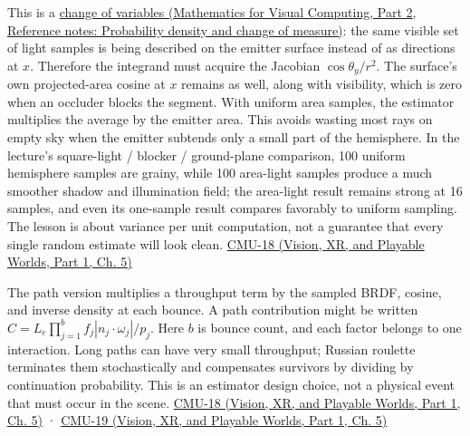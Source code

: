 This is a \href{../02-Mathematics-for-Visual-Computing-P02/main.pdf\#nameddest=appendix-4815cd87ab8b}{change of variables (Mathematics for Visual Computing, Part 2, Reference notes: Probability density and change of measure)}: the same visible set of light samples is being described on the emitter surface instead of as directions at \(x\). Therefore the integrand must acquire the Jacobian \(\cos\theta_y/r^2\). The surface's own projected-area cosine at \(x\) remains as well, along with visibility, which is zero when an occluder blocks the segment. With uniform area samples, the estimator multiplies the average by the emitter area. This avoids wasting most rays on empty sky when the emitter subtends only a small part of the hemisphere. In the lecture's square-light / blocker / ground-plane comparison, 100 uniform hemisphere samples are grainy, while 100 area-light samples produce a much smoother shadow and illumination field; the area-light result remains strong at 16 samples, and even its one-sample result compares favorably to uniform sampling. The lesson is about variance per unit computation, not a guarantee that every single random estimate will look clean. \href{../07-Vision-XR-and-Playable-Worlds-P01/main.pdf\#nameddest=04-visual-computing-ii-ch036-cmu-18---monte-carlo-rendering}{CMU-18 (Vision, XR, and Playable Worlds, Part 1, Ch. 5)}

The path version multiplies a throughput term by the sampled BRDF, cosine, and inverse density at each bounce. A path contribution might be written \(C= L_e\prod_{j=1}^b f_j|n_j\cdot\omega_j|/p_j\). Here \(b\) is bounce count, and each factor belongs to one interaction. Long paths can have very small throughput; Russian roulette terminates them stochastically and compensates survivors by dividing by continuation probability. This is an estimator design choice, not a physical event that must occur in the scene. \href{../07-Vision-XR-and-Playable-Worlds-P01/main.pdf\#nameddest=04-visual-computing-ii-ch036-cmu-18---monte-carlo-rendering}{CMU-18 (Vision, XR, and Playable Worlds, Part 1, Ch. 5)} · \href{../07-Vision-XR-and-Playable-Worlds-P01/main.pdf\#nameddest=04-visual-computing-ii-ch036-cmu-19---variance-reduction}{CMU-19 (Vision, XR, and Playable Worlds, Part 1, Ch. 5)}

